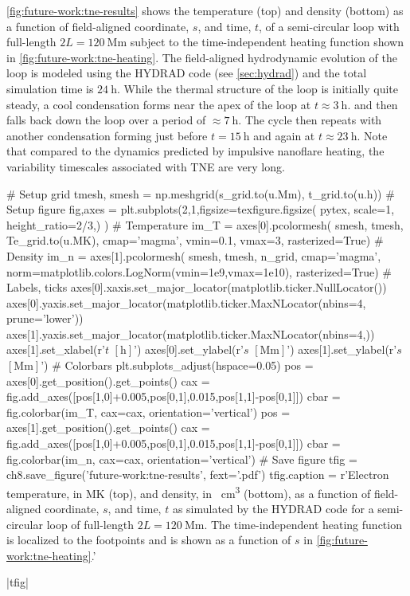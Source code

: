 \autoref{fig:future-work:tne-results} shows the temperature (top) and density (bottom) as a function of field-aligned coordinate, $s$, and time, $t$, of a semi-circular loop with full-length $2L=\SI{120}{\mega\m}$ subject to the time-independent heating function shown in \autoref{fig:future-work:tne-heating}. The field-aligned hydrodynamic evolution of the loop is modeled using the HYDRAD code (see \autoref{sec:hydrad}) and the total simulation time is $\SI{24}{\hour}$. While the thermal structure of the loop is initially quite steady, a cool condensation forms near the apex of the loop at $t\approx\SI{3}{\hour}$. and then falls back down the loop over a period of $\approx\SI{7}{\hour}$. The cycle then repeats with another condensation forming just before $t=\SI{15}{\hour}$ and again at $t\approx\SI{23}{\hour}$. Note that compared to the dynamics predicted by impulsive nanoflare heating, the variability timescales associated with TNE are very long. 

\begin{pycode}[chapter8]
# Setup grid
tmesh, smesh = np.meshgrid(s_grid.to(u.Mm), t_grid.to(u.h))
# Setup figure
fig,axes = plt.subplots(2,1,figsize=texfigure.figsize(
    pytex,
    scale=1,
    height_ratio=2/3,)
)
# Temperature
im_T = axes[0].pcolormesh(
    smesh, tmesh, Te_grid.to(u.MK),
    cmap='magma',
    vmin=0.1,
    vmax=3,
    rasterized=True)
# Density
im_n = axes[1].pcolormesh(
    smesh, tmesh, n_grid,
    cmap='magma',
    norm=matplotlib.colors.LogNorm(vmin=1e9,vmax=1e10),
    rasterized=True)
# Labels, ticks
axes[0].xaxis.set_major_locator(matplotlib.ticker.NullLocator())
axes[0].yaxis.set_major_locator(matplotlib.ticker.MaxNLocator(nbins=4, prune='lower'))
axes[1].yaxis.set_major_locator(matplotlib.ticker.MaxNLocator(nbins=4,))
axes[1].set_xlabel(r'$t$ $[\si{\hour}]$')
axes[0].set_ylabel(r'$s$ $[\si{\mega\m}]$')
axes[1].set_ylabel(r'$s$ $[\si{\mega\m}]$')
# Colorbars
plt.subplots_adjust(hspace=0.05)
pos = axes[0].get_position().get_points()
cax = fig.add_axes([pos[1,0]+0.005,pos[0,1],0.015,pos[1,1]-pos[0,1]])
cbar = fig.colorbar(im_T, cax=cax, orientation='vertical')
pos = axes[1].get_position().get_points()
cax = fig.add_axes([pos[1,0]+0.005,pos[0,1],0.015,pos[1,1]-pos[0,1]])
cbar = fig.colorbar(im_n, cax=cax, orientation='vertical')
# Save figure
tfig = ch8.save_figure('future-work:tne-results', fext='.pdf')
tfig.caption = r'Electron temperature, in \si{\mega\kelvin} (top), and density, in \si{\per\cubic\cm} (bottom), as a function of field-aligned coordinate, $s$, and time, $t$ as simulated by the HYDRAD code for a semi-circular loop of full-length $2L=\SI{120}{\mega\m}$. The time-independent heating function is localized to the footpoints and is shown as a function of $s$ in \autoref{fig:future-work:tne-heating}.'
\end{pycode}
\py[chapter8]|tfig|

